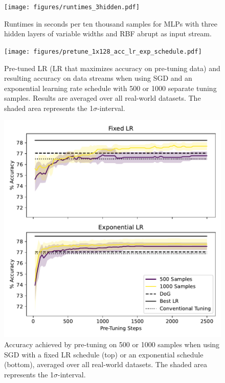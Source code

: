 \documentclass[letterpaper]{article} %
\begin{document}
\begin{figure}
	\centering
	\texttt{[image: figures/runtimes\_3hidden.pdf]}
	\caption{Runtimes in seconds per ten thousand samples for MLPs with three hidden layers of variable widths and RBF abrupt as input stream.}\label{fig:runtimes}
\end{figure}

\begin{figure}
	\centering
	\texttt{[image: figures/pretune\_1x128\_acc\_lr\_exp\_schedule.pdf]}
	\caption{Pre-tuned LR (LR that maximizes accuracy on pre-tuning data) and resulting accuracy on data streams when using SGD and an exponential learning rate schedule with 500 or 1000 separate tuning samples. Results are averaged over all real-world datasets. The shaded area represents the 1$\sigma$-interval.}\label{fig:pretune_lr_accuracy}
\end{figure}

\begin{figure}
	\centering
	\includegraphics[width=.47\textwidth]{figures/pretune_1x64_fixed_vs_exp_schedule.pdf}
	\caption{Accuracy achieved by pre-tuning on 500 or 1000 samples when using SGD with a fixed LR schedule (top) or an exponential schedule (bottom), averaged over all real-world datasets. The shaded area represents the 1$\sigma$-interval.}\label{fig:pretune_fixed_vs_exp_lr}
\end{figure}
\end{document}

